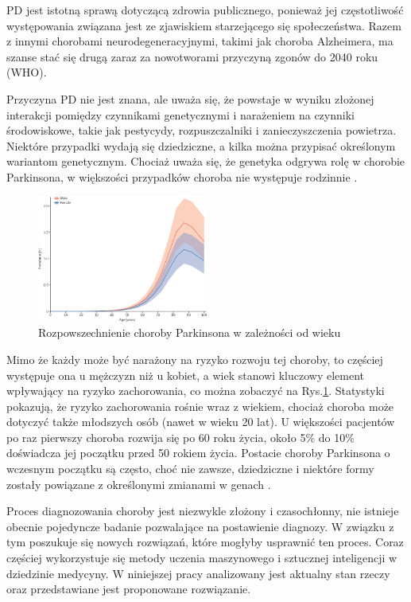 PD jest istotną sprawą dotyczącą zdrowia publicznego, ponieważ jej częstotliwość występowania związana jest ze zjawiskiem starzejącego się społeczeństwa.
Razem z innymi chorobami neurodegeneracyjnymi, takimi jak choroba Alzheimera, ma szanse stać się drugą zaraz za nowotworami przyczyną zgonów do 2040 roku (WHO).

Przyczyna PD nie jest znana, ale uważa się, że powstaje w wyniku złożonej interakcji pomiędzy czynnikami genetycznymi i
narażeniem na czynniki środowiskowe, takie jak pestycydy, rozpuszczalniki i zanieczyszczenia powietrza.
Niektóre przypadki wydają się dziedziczne, a kilka można przypisać określonym wariantom genetycznym.
Chociaż uważa się, że genetyka odgrywa rolę w chorobie Parkinsona, w większości przypadków choroba nie występuje rodzinnie \cite{National_Institute_on_Aging_2022}.

\begin{figure}[htbp]
	\centering
	\includegraphics[width=0.5\textwidth]{./img/PD_prevalence}
	\caption{Rozpowszechnienie choroby Parkinsona w zależności od wieku \cite{global_PD}}
    \label{fig:PD_prevalance}
\end{figure}

Mimo że każdy może być narażony na ryzyko rozwoju tej choroby, to częściej występuje ona u mężczyzn niż u kobiet,
a wiek stanowi kluczowy element wpływający na ryzyko zachorowania, co można zobaczyć na Rys.\ref{fig:PD_prevalance}.
Statystyki pokazują, że ryzyko zachorowania rośnie wraz z wiekiem, chociaż choroba może dotyczyć także młodszych osób (nawet w wieku 20 lat).
U większości pacjentów po raz pierwszy choroba rozwija się po 60 roku życia, około 5\% do 10\% doświadcza jej początku przed 50 rokiem życia.
Postacie choroby Parkinsona o wczesnym początku są często, choć nie zawsze, dziedziczne i niektóre formy zostały powiązane z
określonymi zmianami w genach \cite{National_Institute_on_Aging_2022}.

Proces diagnozowania choroby jest niezwykle złożony i czasochłonny, nie istnieje obecnie pojedyncze badanie pozwalające na postawienie diagnozy.
W związku z tym poszukuje się nowych rozwiązań, które mogłyby usprawnić ten proces.
Coraz częściej wykorzystuje się metody uczenia maszynowego i sztucznej inteligencji w dziedzinie medycyny.
W niniejszej pracy analizowany jest aktualny stan rzeczy oraz przedstawiane jest proponowane rozwiązanie.

